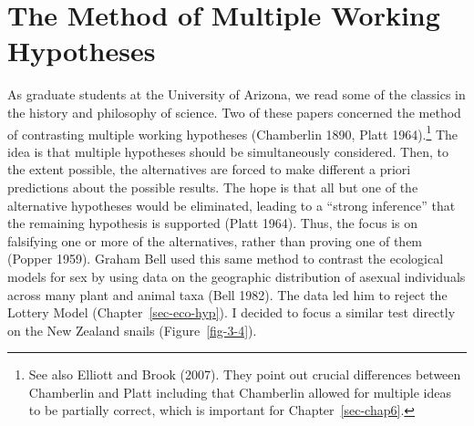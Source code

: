 \documentclass[
  letterpaper,
]{book}
\begin{document}
\hypertarget{the-method-of-multiple-working-hypotheses}{%
\section{The Method of Multiple Working
Hypotheses}\label{the-method-of-multiple-working-hypotheses}}

As graduate students at the University of Arizona, we read some of the
classics in the history and philosophy of science. Two of these papers
concerned the method of contrasting multiple working hypotheses
(Chamberlin 1890, Platt 1964).\footnote{See also Elliott and Brook
  (2007). They point out crucial differences between Chamberlin and
  Platt including that Chamberlin allowed for multiple ideas to be
  partially correct, which is important for Chapter~\ref{sec-chap6}.}
The idea is that multiple hypotheses should be simultaneously
considered. Then, to the extent possible, the alternatives are forced to
make different a priori predictions about the possible results. The hope
is that all but one of the alternative hypotheses would be eliminated,
leading to a ``strong inference'' that the remaining hypothesis is
supported (Platt 1964). Thus, the focus is on falsifying one or more of
the alternatives, rather than proving one of them (Popper 1959). Graham
Bell used this same method to contrast the ecological models for sex by
using data on the geographic distribution of asexual individuals across
many plant and animal taxa (Bell 1982). The data led him to reject the
Lottery Model (Chapter~\ref{sec-eco-hyp}). I decided to focus a similar
test directly on the New Zealand snails (Figure~\ref{fig-3-4}).
\end{document}

